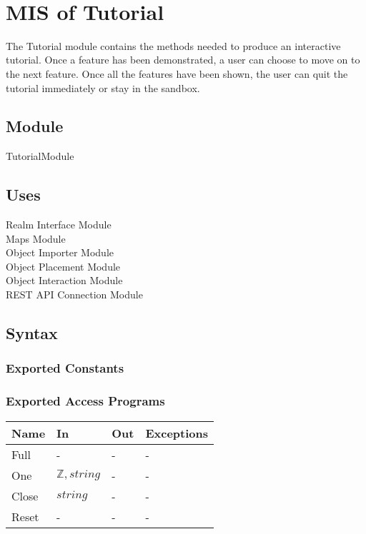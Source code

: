 \documentclass[12pt, titlepage]{article}
\begin{document}
\newpage
~\newpage

\section{MIS of Tutorial} \label{Tutorial}

The Tutorial module contains the methods needed to produce an interactive tutorial. Once a feature has been demonstrated, a user can choose to move on to the next feature. Once all the features have been shown, the user can quit the tutorial immediately or stay in the sandbox.

\subsection{Module}

TutorialModule

\subsection{Uses}

Realm Interface Module\\
Maps Module\\
Object Importer Module\\
Object Placement Module\\
Object Interaction Module\\
REST API Connection Module

\subsection{Syntax}

\subsubsection{Exported Constants}

\subsubsection{Exported Access Programs}

\begin{center}
\begin{tabular}{p{2cm} p{4cm} p{4cm} p{2cm}}
\hline
\textbf{Name} & \textbf{In} & \textbf{Out} & \textbf{Exceptions} \\
\hline
Full & - & - & - \\
One & $\mathbb{Z}, string$ & - & - \\
Close & $string$ & - & - \\
Reset & - & - & - \\
\hline
\end{tabular}
\end{center}
\end{document}
